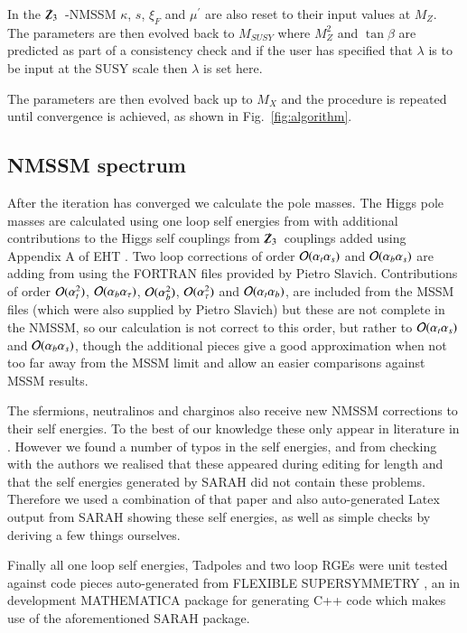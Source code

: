 \documentclass[final,3p,times,pdflatex]{elsarticle}
\newcommand{\Zv}{{\mbox{$\slashed{Z}_{3}$}\ }} %
\def\at{\alpha_t}
\def\ab{\alpha_b}
\def\as{\alpha_s}
\def\atau{\alpha_{\tau}}
\def\oatab{{\cal O}(\at\ab)}
\def\oatas{{\cal O}(\at\as)}
\def\oabas{{\cal O}(\ab\as)}
\def\oatq{{\cal O}(\at^2)}
\def\oabq{{\cal O}(\ab^2)}
\def\oatauq{{\cal O}(\atau^2)}
\def\oabatau{{\cal O}(\ab \atau)}
\begin{document}
In the \Zv-NMSSM $\kappa$, $s$, $\xi_F$ and $\mu^\prime$ are also
reset to their input values at $M_Z$.  The parameters are then evolved
back to $M_{SUSY}$ where $M_Z^2$ and $\tan\beta$ are predicted as
part of a consistency check and if the user has specified that
$\lambda$ is to be input at the SUSY scale then $\lambda$ is set here.


The parameters are then evolved back up to $M_X$ and the procedure is repeated until convergence is achieved, as shown in Fig.~\ref{fig:algorithm}. 

\subsection{NMSSM spectrum \label{spec}}
After the iteration has converged we calculate the pole masses.  The
Higgs pole masses are calculated using one loop self energies from 
\cite{Degrassi:2009yq} with additional contributions to the Higgs self
couplings from \Zv couplings added using Appendix A of
EHT \cite{Ellwanger:2009dp}.  Two loop corrections of order $\oatas$ and
$\oabas$ are adding from \cite{Degrassi:2009yq} using the FORTRAN
files provided by Pietro Slavich.  Contributions of order $\oatq$,
$\oabatau$, $\oabq$, $\oatauq$ and $\oatab$, are included from the
MSSM files (which were also supplied by Pietro Slavich) but these are
not complete in the NMSSM, so our calculation is not correct to this
order, but rather to $\oatas$ and $\oabas$, though the additional
pieces give a good approximation when not too far away from the MSSM
limit and allow an easier comparisons against MSSM results.

The sfermions, neutralinos and charginos also receive new NMSSM
corrections to their self energies. To the best of our knowledge these
only appear in literature in \cite{Staub:2010ty}.  However we found a
number of typos in the self energies, and from checking with the
authors we realised that these appeared during editing for length and
that the self energies generated by SARAH
\cite{Staub:2009bi,Staub:2010jh,Staub:2012pb,Staub:2013tta} did not
contain these problems.  Therefore we used a combination of that paper
and also auto-generated Latex output from SARAH showing these self
energies, as well as simple checks by deriving a few things ourselves.

Finally all one loop self energies, Tadpoles and two loop RGEs were unit tested against code pieces auto-generated from FLEXIBLE SUPERSYMMETRY \cite{flexi-susy}, an in development MATHEMATICA package for generating C++ code which makes use of the aforementioned SARAH package\cite{Staub:2009bi,Staub:2010jh,Staub:2012pb,Staub:2013tta}. 
\end{document}
